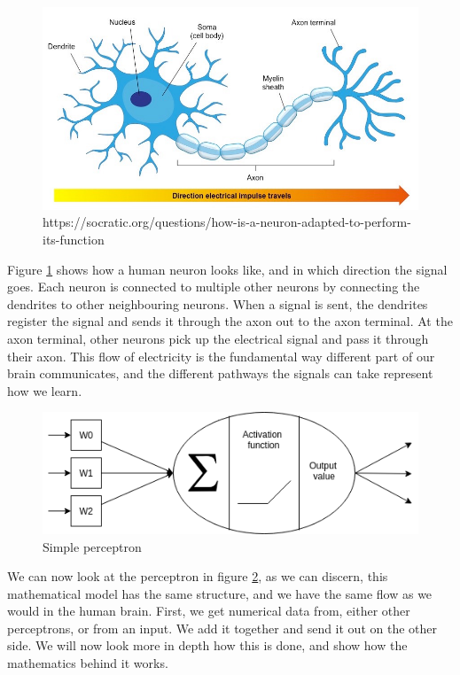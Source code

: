 \begin{figure}[h]
        \centering
        \includegraphics[scale=0.5]{background/figures/neuron.jpg}
        \caption{https://socratic.org/questions/how-is-a-neuron-adapted-to-perform-its-function}
        \label{fig:neuron}
\end{figure}



Figure \ref{fig:neuron} shows how a human neuron looks like, and in which direction the signal goes. Each neuron is connected to multiple other neurons by connecting the dendrites to other neighbouring neurons. 
When a signal is sent, the dendrites register the signal and sends it through the axon out to the axon terminal. At the axon terminal, other neurons pick up the electrical signal and pass it through their axon.
This flow of electricity is the fundamental way different part of our brain communicates, and the different pathways the signals can take represent how we learn. 

\begin{figure}[h]
        \centering
        \includegraphics[scale=0.5]{background/figures/perceptron.png}
        \caption{Simple perceptron}
    \label{fig:perceptron}
\end{figure}

We can now look at the perceptron in figure \ref{fig:perceptron}, as we can discern, this mathematical model has the same structure, and we have the same flow as we would in the human brain. 
First, we get numerical data from, either other perceptrons, or from an input. We add it together and send it out on the other side. We will now look more in depth how this is done, and show how the mathematics behind it works. \\

